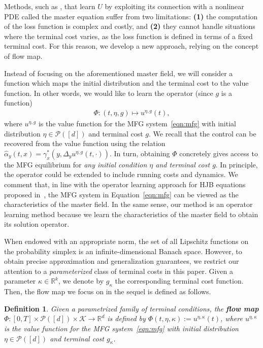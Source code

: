 \documentclass[11pt,reqno]{amsart}
\numberwithin{equation}{section}
\theoremstyle{plain}
\newtheorem{definition}{Definition}[section]
\newcommand{\R}{\mathbb{R}}
\newcommand{\calK}{{\mathcal K}}
\newcommand{\calP}{{\mathcal P}}
\newcommand{\1}{\boldsymbol{\mathbbm{1}}}
\begin{document}
Methods, such as \cite{coh-lau-zel2025}, that learn $U$ by exploiting its connection with a nonlinear PDE called the master equation suffer from two limitations: {\bf (1)} the computation of the loss function is complex and costly, and {\bf (2)} they cannot handle situations where the terminal cost varies, as the loss function is defined in terms of a fixed terminal cost. For this reason, we develop a new approach, relying on the concept of flow map.

 Instead of focusing on the aforementioned master field, we will consider a function which maps the initial distribution and the terminal cost to the value function. In other words, we would like to learn the operator (since $g$ is a function)
\begin{align}
    \label{eq:flow-map}
    \Phi: (t,\eta,g) \mapsto u^{\eta,g}(t),
\end{align}
where $u^{\eta, g}$ is the value function for the MFG system~\eqref{eqn:mfg} with initial distribution $\eta \in \calP([d])$ and terminal cost $g$. We recall that the control can be recovered from the value function using the relation $\widehat\alpha_y(t,x) = \gamma^*_x(y,\Delta_y u^{\eta, g} (t,\cdot))$. In turn, obtaining $\Phi$ concretely gives access to the MFG equilibrium for \emph{any initial condition $\eta$ and terminal cost $g$}. In principle, the operator could be extended to include running costs and dynamics. We comment that, in line with the operator learning approach for HJB equations proposed in~\cite{Lanthaler2025}, the MFG system in Equation~\eqref{eqn:mfg} can be viewed as the characteristics of the master field. In the same sense, our method is an operator learning method because we learn the characteristics of the master field to obtain its solution operator.

When endowed with an appropriate norm, the set of all Lipschitz functions on the probability simplex is an infinite-dimensional Banach space. However, to obtain precise approximation and generalization guarantees, we restrict our attention to a \emph{parameterized} class of terminal costs in this paper. Given a parameter $\kappa \in \R^k$, we denote by $g_\kappa$ the corresponding terminal cost function. Then, the flow map we focus on in the sequel is defined as follows.
\begin{definition}
\label{def:flow-map}
Given a parametrized family of terminal conditions, the \textbf{flow map} $\Phi : [0, T] \times \calP([d]) \times \calK \to \R^d$ is defined by $\Phi(t, \eta, \kappa) := u^{\eta, \kappa}(t)$, where $u^{\eta, \kappa}$ is the value function for the MFG system~\eqref{eqn:mfg} with initial distribution $\eta \in \calP([d])$ and terminal cost $g_\kappa$.
\end{definition}
\end{document}
